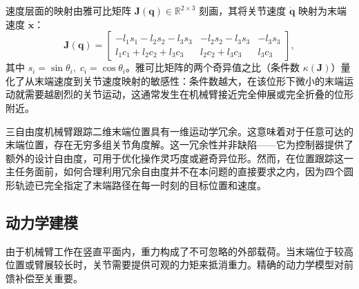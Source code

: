 \documentclass{article}
\begin{document}
速度层面的映射由雅可比矩阵 \(\boldsymbol{J}(\boldsymbol{q})\in\mathbb{R}^{2\times 3}\) 刻画，其将关节速度 \(\dot{\boldsymbol{q}}\) 映射为末端速度 \(\dot{\boldsymbol{x}}\)：
\begin{equation}
\boldsymbol{J}(\boldsymbol{q}) = \begin{bmatrix}
-l_1 s_1 - l_2 s_2 - l_3 s_3 & -l_2 s_2 - l_3 s_3 & -l_3 s_3 \\[2pt]
 l_1 c_1 + l_2 c_2 + l_3 c_3 &  l_2 c_2 + l_3 c_3 &  l_3 c_3
\end{bmatrix},
\end{equation}
其中 \(s_i = \sin\theta_i,\; c_i = \cos\theta_i\)。雅可比矩阵的两个奇异值之比（条件数 \(\kappa(\boldsymbol{J})\)）量化了从末端速度到关节速度映射的敏感性：条件数越大，在该位形下微小的末端运动就需要越剧烈的关节运动，这通常发生在机械臂接近完全伸展或完全折叠的位形附近。

三自由度机械臂跟踪二维末端位置具有一维运动学冗余。这意味着对于任意可达的末端位置，存在无穷多组关节角度解。这一冗余性并非缺陷——它为控制器提供了额外的设计自由度，可用于优化操作灵巧度或避奇异位形。然而，在位置跟踪这一主任务面前，如何合理利用冗余自由度并不在本问题的直接要求之内，因为四个圆形轨迹已完全指定了末端路径在每一时刻的目标位置和速度。

\subsection{动力学建模}

由于机械臂工作在竖直平面内，重力构成了不可忽略的外部载荷。当末端位于较高位置或臂展较长时，关节需要提供可观的力矩来抵消重力。精确的动力学模型对前馈补偿至关重要。
\end{document}
